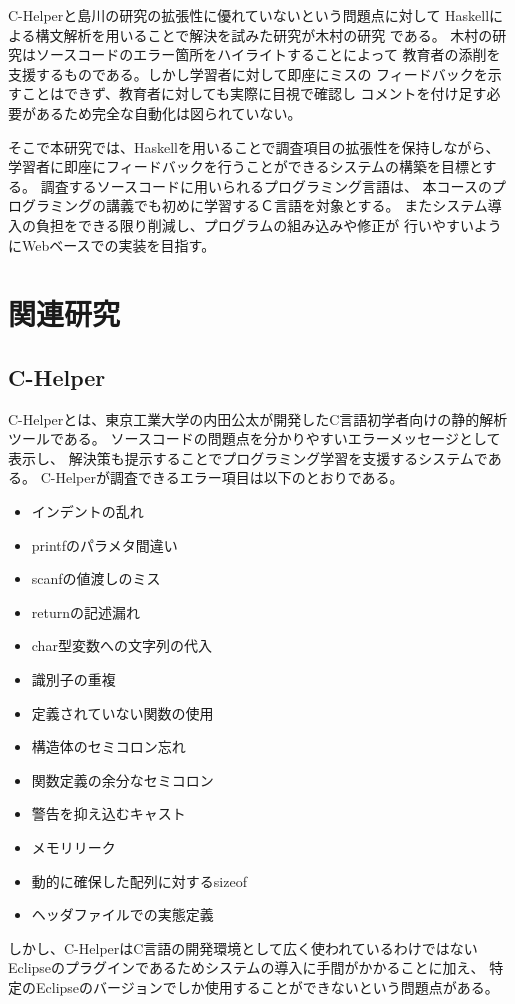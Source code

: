 \documentclass{csspaper}
\begin{document}
      C-Helperと島川の研究の拡張性に優れていないという問題点に対して
      Haskellによる構文解析を用いることで解決を試みた研究が木村の研究 \cite{5}である。
      木村の研究はソースコードのエラー箇所をハイライトすることによって
      教育者の添削を支援するものである。しかし学習者に対して即座にミスの
      フィードバックを示すことはできず、教育者に対しても実際に目視で確認し
      コメントを付け足す必要があるため完全な自動化は図られていない。

      そこで本研究では、Haskellを用いることで調査項目の拡張性を保持しながら、
      学習者に即座にフィードバックを行うことができるシステムの構築を目標とする。
      調査するソースコードに用いられるプログラミング言語は、
      本コースのプログラミングの講義でも初めに学習するＣ言語を対象とする。
      またシステム導入の負担をできる限り削減し、プログラムの組み込みや修正が
      行いやすいようにWebベースでの実装を目指す。

      \section{関連研究}
         \subsection{C-Helper}
         C-Helperとは、東京工業大学の内田公太が開発したC言語初学者向けの静的解析ツールである。
         ソースコードの問題点を分かりやすいエラーメッセージとして表示し、
         解決策も提示することでプログラミング学習を支援するシステムである。
         C-Helperが調査できるエラー項目は以下のとおりである。
         \begin{itemize}
            \item インデントの乱れ
            \item printfのパラメタ間違い
            \item scanfの値渡しのミス
            \item returnの記述漏れ
            \item char型変数への文字列の代入
            \item 識別子の重複
            \item 定義されていない関数の使用
            \item 構造体のセミコロン忘れ
            \item 関数定義の余分なセミコロン
            \item 警告を抑え込むキャスト
            \item メモリリーク
            \item 動的に確保した配列に対するsizeof
            \item ヘッダファイルでの実態定義
         \end{itemize}
         しかし、C-HelperはC言語の開発環境として広く使われているわけではない
         Eclipseのプラグインであるためシステムの導入に手間がかかることに加え、
         特定のEclipseのバージョンでしか使用することができないという問題点がある。
\end{document}
